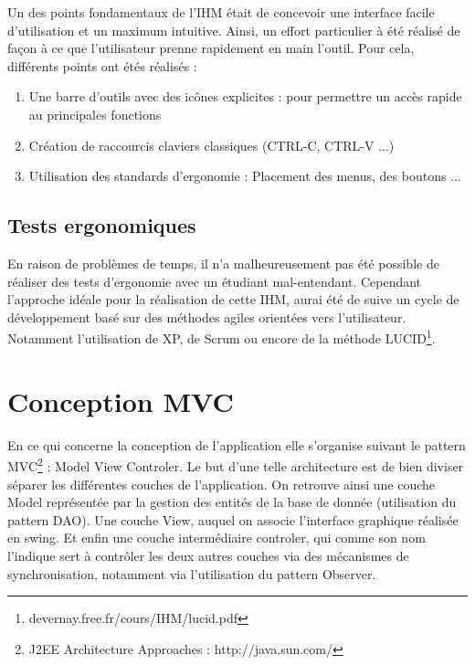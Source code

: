 Un des points fondamentaux de l'IHM était de concevoir une interface facile d'utilisation et un maximum intuitive. Ainsi, un effort particulier à été réalisé de façon à ce que l'utilisateur prenne rapidement en main l'outil. Pour cela, différents points ont étés réalisés :

\begin{enumerate}
 \item Une barre d'outils avec des icônes explicites : pour permettre un accès rapide au principales fonctions
 \item Création de raccourcis claviers classiques (CTRL-C, CTRL-V ...)
 \item Utilisation des standards d'ergonomie : Placement des menus, des boutons ...
\end{enumerate}

\subsection{Tests ergonomiques}

En raison de problèmes de temps, il n'a malheureusement pas été possible de réaliser des tests d'ergonomie avec un étudiant mal-entendant. Cependant  l'approche idéale pour la réalisation de cette IHM, aurai été de suive un cycle de développement basé sur des méthodes agiles orientées vers l'utilisateur. Notamment l'utilisation de XP, de Scrum ou encore de la méthode LUCID\footnote{devernay.free.fr/cours/IHM/lucid.pdf}.


\section{Conception MVC}

En ce qui concerne la conception de l'application elle s'organise suivant le pattern MVC\footnote{J2EE Architecture Approaches : http://java.sun.com/} : Model View Controler. Le but d'une telle architecture est de bien diviser séparer les différentes couches de l'application. On retrouve ainsi une couche Model représentée par la gestion des entités de la base de donnée (utilisation du pattern DAO). Une couche View, auquel on associe l'interface graphique réalisée en swing. Et enfin une couche intermédiaire controler, qui comme son nom l'indique sert à contrôler les deux autres couches via des mécanismes de synchronisation, notamment via l'utilisation du pattern Observer. 



